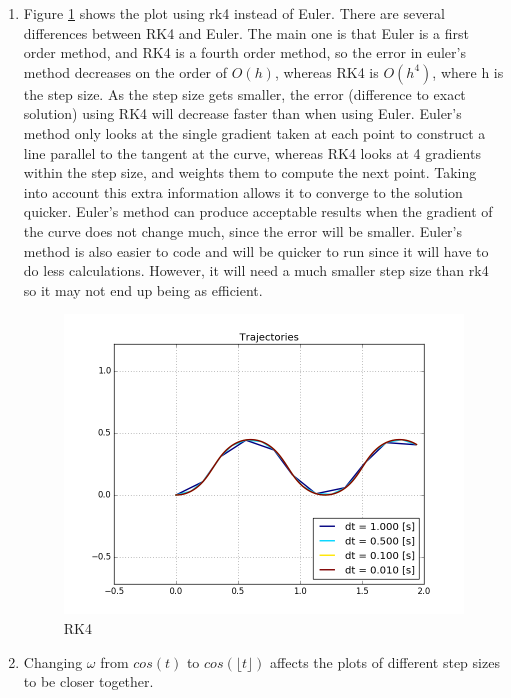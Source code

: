 \documentclass[12pt,a4paper]{article}
\begin{document}
\begin{enumerate}[label=(\alph*)]
	\item Figure \ref{fig:rk4} shows the plot using rk4 instead of Euler. There are several differences between RK4 and Euler. The main one is that Euler is a first order method, and RK4 is a fourth order method, so the error in euler's method decreases on the order of $O(h)$, whereas RK4 is $O(h^4)$, where h is the step size. As the step size gets smaller, the error (difference to exact solution) using RK4 will decrease faster than when using Euler. Euler's method only looks at the single gradient taken at each point to construct a line parallel to the tangent at the curve, whereas RK4 looks at 4 gradients within the step size, and weights them to compute the next point. Taking into account this extra information allows it to converge to the solution quicker. Euler's method can produce acceptable results when the gradient of the curve does not change much, since the error will be smaller. Euler's method is also easier to code and will be quicker to run since it will have to do less calculations. However, it will need a much smaller step size than rk4 so it may not end up being as efficient.
	      \begin{figure}[h]
	      	\centering
	      	\includegraphics[width=\textwidth]{fig/1e.png}
	      	\caption{RK4}
	      	\label{fig:rk4}
	      \end{figure}
	\item Changing $\omega$ from $cos(t)$ to $cos(\lfloor t \rfloor)$ affects the plots of different step sizes to be closer together.
	      \begin{figure}[h]
	      	\centering

\end{figure}
\end{enumerate}
\end{document}
